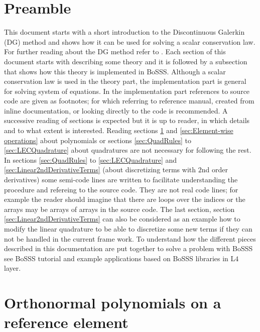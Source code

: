 \documentclass[11pt,twoside,a4paper]{fdyarticle}
\begin{document}
\section*{Preamble}
This document starts with a short introduction to the Discontinuous Galerkin (DG) method and shows how it can be used for solving a scalar conservation law. For further reading about the DG method refer to \cite{HesthavenWarburton08}. Each section of this document starts with describing some theory and it is followed by a subsection that shows how this theory is implemented in BoSSS. Although a scalar conservation law is used in the theory part, the implementation part is general for solving system of equations. In the implementation part references to source code are given as footnotes; for which referring to reference manual, created from inline documentation, or looking directly to the code is recommended. A successive reading of sections is expected but it is up to reader, in which details and to what extent is interested. Reading sections \ref{sec:Polynomials} and \ref{sec:Element-wise operations} about polynomials or sections \ref{sec:QuadRules} to \ref{sec:LECQuadrature} about quadratures are not necessary for following the rest. In sections \ref{sec:QuadRules} to \ref{sec:LECQuadrature} and \ref{sec:Linear2ndDerivativeTerms} (about discretizing terms with $2$nd order derivatives) some semi-code lines are written to facilitate understanding the procedure and refereing to the source code. They are not real code lines; for example the reader should imagine that there are loops over the indices or the arrays may be arrays of arrays in the source code. The last section, section \ref{sec:Linear2ndDerivativeTerms} can also be considered as an example how to modify the linear quadrature to be able to discretize some new terms if they can not be handled in the current frame work. To understand how the different pieces described in this documentation are put together to solve a problem with BoSSS see BoSSS tutorial and example applications based on BoSSS libraries in L$4$ layer.

\newpage
\tableofcontents

\newpage
\printnomenclature

\newpage


\newpage
\section{Orthonormal polynomials on a reference element}
\label{sec:Polynomials}

\end{document}

